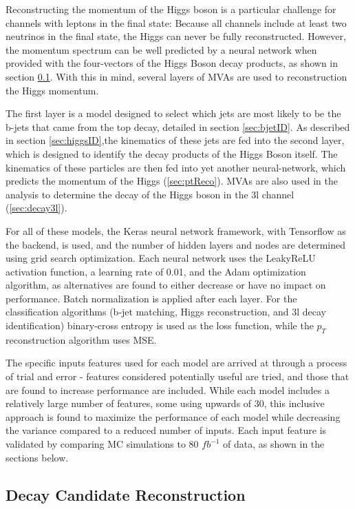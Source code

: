 Reconstructing the momentum of the Higgs boson is a particular challenge for channels with leptons in the final state: Because all channels include at least two neutrinos in the final state, the Higgs can never be fully reconstructed. However, the momentum spectrum can be well predicted by a neural network when provided with the four-vectors of the Higgs Boson decay products, as shown in section \ref{sec:truthLevelReco}. With this in mind, several layers of MVAs are used to reconstruction the Higgs momentum. 

The first layer is a model designed to select which jets are most likely to be the b-jets that came from the top decay, detailed in section \ref{sec:bjetID}. As described in section \ref{sec:higgsID},the kinematics of these jets are fed into the second layer, which is designed to identify the decay products of the Higgs Boson itself. The kinematics of these particles are then fed into yet another neural-network, which predicts the momentum of the Higgs (\ref{sec:ptReco}). MVAs are also used in the analysis to determine the decay of the Higgs boson in the 3l channel (\ref{sec:decay3l}). 

For all of these models, the Keras neural network framework, with Tensorflow as the backend, is used, and the number of hidden layers and nodes are determined using grid search optimization. Each neural network uses the LeakyReLU activation function, a learning rate of 0.01, and the Adam optimization algorithm, as alternatives are found to either decrease or have no impact on performance. Batch normalization is applied after each layer. For the classification algorithms (b-jet matching, Higgs reconstruction, and 3l decay identification) binary-cross entropy is used as the loss function, while the $p_T$ reconstruction algorithm uses MSE. 

The specific inputs features used for each model are arrived at through a process of trial and error - features considered potentially useful are tried, and those that are found to increase performance are included. While each model includes a relatively large number of features, some using upwards of 30, this inclusive approach is found to maximize the performance of each model while decreasing the variance compared to a reduced number of inputs. Each input feature is validated by comparing MC simulations to 80 $fb^{-1}$ of data, as shown in the sections below.

\subsection{Decay Candidate Reconstruction}
\label{sec:truthLevelReco}

